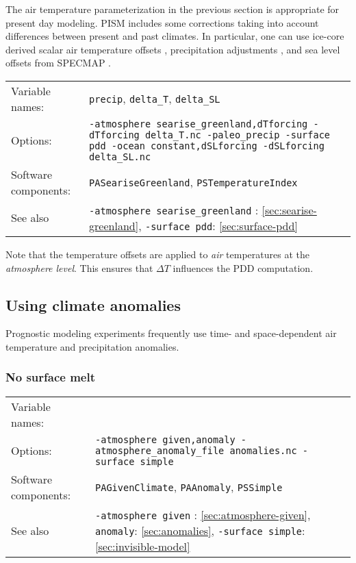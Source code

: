 \documentclass[titlepage,letterpaper,final]{scrartcl}
\begin{document}
The air temperature parameterization in the previous section is appropriate for
present  day  modeling. PISM  includes  some  corrections  taking into  account
differences  between present  and past  climates.  In particular,  one can  use
ice-core  derived   scalar  air  temperature   offsets  \cite{JohnsenetalGRIP},
precipitation  adjustments  \cite{Huybrechts02},  and  sea level  offsets  from
SPECMAP \cite{Imbrieetal1984}.

\begin{center}
  \begin{tabular}{lp{}}
    \toprule
    Variable names: & \texttt{precip}, \texttt{delta_T}, \texttt{delta_SL}\\
    Options: & \texttt{-atmosphere searise_greenland,dTforcing
      \mbox{-dTforcing delta_T.nc}
      -paleo_precip  -surface pdd \mbox{-ocean constant,dSLforcing}
      -dSLforcing delta_SL.nc} \\
    Software components: & \texttt{PASeariseGreenland}, \texttt{PSTemperatureIndex} \\
    See also & \texttt{-atmosphere searise_greenland} : \ref{sec:searise-greenland},
    \texttt{-surface pdd}: \ref{sec:surface-pdd} \\
    \bottomrule
  \end{tabular}
\end{center}

Note that the temperature offsets are applied to \emph{air} temperatures at the
\emph{atmosphere level}. This ensures that $\Delta T$ influences the PDD
computation.

\subsection{Using climate anomalies}
\label{sec:use-case-climate-anomalies}

Prognostic modeling experiments frequently use time- and space-dependent
air temperature and precipitation anomalies.

\subsubsection{No surface melt}
\label{sec:use-case-anomalies-antarctica}

\begin{center}
  \begin{tabular}{lp{}}
    \toprule
    Variable names: & \\
    Options:  &  \texttt{-atmosphere given,anomaly  -atmosphere_anomaly_file
      anomalies.nc -surface simple} \\
    Software components: & \texttt{PAGivenClimate}, \texttt{PAAnomaly}, \texttt{PSSimple}\\
    See  also   &  \texttt{-atmosphere  given}   :  \ref{sec:atmosphere-given},
    \texttt{anomaly}: \ref{sec:anomalies}, \texttt{-surface simple}: \ref{sec:invisible-model}\\
    \bottomrule
  \end{tabular}
\end{center}
\end{document}
